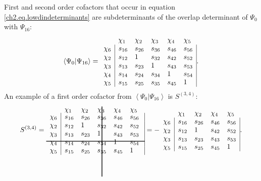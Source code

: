First and second order cofactors that occur in equation \ref{ch2.eq.lowdindeterminants} are subdeterminants of the overlap determinant of $\Psi_0$ with $\Psi_{16}$:
\begin{equation}
\left < \Psi_0 | \Psi_{16} \right> =
\begin{array}{llllll}
 &  \chi_1 & \chi_2 & \chi_3 & \chi_4 & \chi_5 \\
 \chi_6 & \multicolumn{1}{|l}{ s_{16} } & s_{26} & s_{36} & s_{46} & \multicolumn{1}{l|}{ s_{56} } \\
 \chi_2 & \multicolumn{1}{|l}{ s_{12} } & 1 & s_{32} & s_{42} & \multicolumn{1}{l|}{ s_{52} } \\
 \chi_3 & \multicolumn{1}{|l}{ s_{13} } & s_{23} & 1 & s_{43} & \multicolumn{1}{l|}{ s_{53} } \\
 \chi_4 & \multicolumn{1}{|l}{ s_{14} } & s_{24} & s_{34} & 1 & \multicolumn{1}{l|}{ s_{54} } \\
 \chi_5 & \multicolumn{1}{|l}{ s_{15} } & s_{25} & s_{35} & s_{45} & \multicolumn{1}{l|}{ 1 }
\end{array}.
\label{ch2.eq.s016g}
\end{equation}
An example of a first order cofactor from $\left < \Psi_0 | \Psi_{16} \right>$ is $S^{(3,4)}$:
\begin{equation}
S^{(3,4)}=
\begin{array}{llllll}
 & \hskip 53.0 pt \hbox{\lower 93pt\hbox{\vrule height100pt width 1.0pt}}\hskip-54.0pt \chi_1 & \chi_2 & \chi_3 & \chi_4 & \chi_5 \\
 \noalign{\vskip-91pt}
 \chi_6 & \multicolumn{1}{|l}{ s_{16} } & s_{26} & s_{36} & s_{46} & \multicolumn{1}{l|}{ s_{56} } \\
 \chi_2 & \multicolumn{1}{|l}{ s_{12} } & 1 & s_{32} & s_{42} & \multicolumn{1}{l|}{ s_{52} } \\
 \chi_3 & \multicolumn{1}{|l}{ s_{13} } & s_{23} & 1 & s_{43} & \multicolumn{1}{l|}{ s_{53} } \\
 \chi_4 & \multicolumn{1}{|l}{ s_{14} } & s_{24} & s_{34} & 1 & \multicolumn{1}{l|}{ s_{54} } \\
 \noalign{\vskip-8pt}
 \multispan6\hbox{\vrule  height 1.0 pt width140pt}\cr
 \noalign{\vskip 7pt}
 \chi_5 & \multicolumn{1}{|l}{ s_{15} } & s_{25} & s_{35} & s_{45} & \multicolumn{1}{l|}{ 1 }
\end{array} =
- \begin{array}{lllll}
 &  \chi_1 & \chi_2 & \chi_4 & \chi_5 \\
 \chi_6 & \multicolumn{1}{|l}{ s_{16} } & s_{26} & s_{46} & \multicolumn{1}{l|}{ s_{56} } \\
 \chi_2 & \multicolumn{1}{|l}{ s_{12} } & 1 & s_{42} & \multicolumn{1}{l|}{ s_{52} } \\
 \chi_3 & \multicolumn{1}{|l}{ s_{13} } & s_{23} & s_{43} & \multicolumn{1}{l|}{s_{53}} \\
 \chi_5 & \multicolumn{1}{|l}{ s_{15} } & s_{25} & s_{45} & \multicolumn{1}{l|}{1}
\end{array}.
\label{ch2.eq.s16g}
\end{equation}

